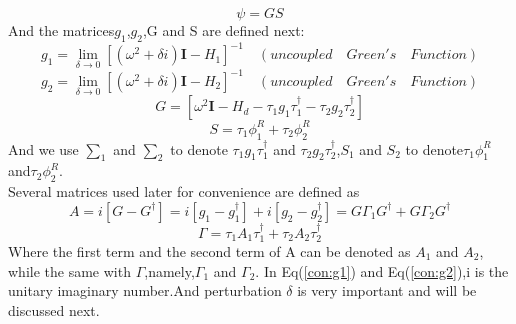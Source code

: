 \begin{equation}
\psi=GS
\end{equation}
And the matrices$g_1$,$g_2$,G and S are defined next:
\begin{equation}
g_1=\lim_{\delta \to 0}[(\omega^2 + \delta i) \textbf{I} - \textbf{$H_1$}]^{-1} \quad (uncoupled\quad Green's\quad Function)
\label{con:g1} 
\end{equation}
\begin{equation}
g_2=\lim_{\delta \to 0}[(\omega^2 + \delta i) \textbf{I} - \textbf{$H_2$}]^{-1} \quad (uncoupled\quad Green's\quad Function)
\label{con:g2} 
\end{equation}
\begin{equation}
G=[\omega^2 \textbf{I} - \textbf{$H_d$}-\tau_1 g_1 \tau_1^{\dag}-\tau_2 g_2 \tau_2^{\dag}]
\end{equation}
\begin{equation}
S=\tau_1\phi_1^R+\tau_2\phi_2^R
\end{equation}
And we use $\sum_1$ and $\sum_2$ to denote $\tau_1 g_1 \tau_1^{\dag}$
and $\tau_2 g_2 \tau_2^{\dag}$,$S_1$ and $S_2$ to denote$\tau_1\phi_1^R$and$\tau_2\phi_2^R$.\\
Several matrices used later for convenience are defined as
\begin{equation}
A=i[G-G^{\dag}]=i[g_1-g_1^{\dag}]+i[g_2-g_2^{\dag}]=G\Gamma_1G^{\dag}+G\Gamma_2G^{\dag}
\end{equation}
\begin{equation}
\Gamma=\tau_1A_1\tau_1^{\dag}+\tau_2A_2\tau_2^{\dag}
\end{equation}
Where the first term and the second term of A can be denoted as $A_1$ and $A_2$, while the same with $\Gamma$,namely,$\Gamma_1$ and $\Gamma_2$.
In Eq(\ref{con:g1}) and Eq(\ref{con:g2}),i is the unitary imaginary number.And perturbation $\delta$ is very important and will be discussed next.
